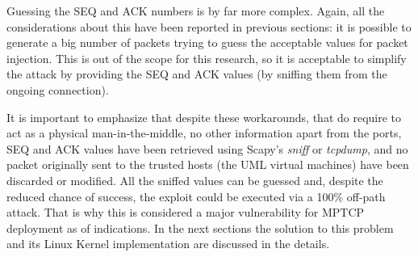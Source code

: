 Guessing the SEQ and ACK numbers is by far more complex. Again, all the considerations about this have been reported in previous sections: it is possible to generate a big number of packets trying to guess the acceptable values for packet injection. This is out of the scope for this research, so it is acceptable to simplify the attack by providing the SEQ and ACK values (by sniffing them from the ongoing connection).

It is important to emphasize that despite these workarounds, that do require to act as a physical man-in-the-middle, no other information apart from the ports, SEQ and ACK values have been retrieved using Scapy's \textit{sniff} or \textit{tcpdump}, and no packet originally sent to the trusted hosts (the UML virtual machines) have been discarded or modified. All the sniffed values can be guessed and, despite the reduced chance of success, the exploit could be executed via a 100\% off-path attack. That is why this is considered a major vulnerability for MPTCP deployment as of  indications. In the next sections the solution to this problem and its Linux Kernel implementation are discussed in the details.